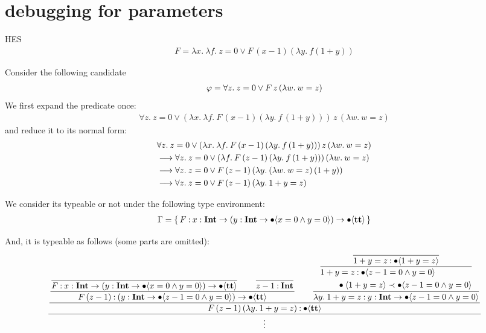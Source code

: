 \documentclass{article}
\begin{document}
\section{debugging for parameters}

HES
\begin{align*}
    F = \lambda x.\: \lambda f.\: z=0 \vee F\, (x-1) (\lambda y.\: f(1+y))
\end{align*}

Consider the following candidate
\begin{align*}
    \varphi = \forall z.\: z=0 \vee F\, z\, (\lambda w.\: w = z)
\end{align*}
We first expand the predicate once:
\begin{align*}
    \forall z.\: z =0\vee (\lambda x.\: \lambda f.\: F\, (x-1) (\lambda y.\: f\,(1+y)))\, z\, (\lambda w.\: w = z)
\end{align*}
and reduce it to its normal form:
\begin{align*}
    &\forall z.\: z=0 \vee (\lambda x.\: \lambda f.\: F\, (x-1)\, (\lambda y.\: f\,(1+y)))\, z\, (\lambda w.\: w = z) \\
    &\longrightarrow \forall z.\: z=0\vee (\lambda f.\: F\, (z-1)\, (\lambda y.\: f\,(1+y)))\, (\lambda w.\: w = z) \\
    &\longrightarrow \forall z.\: z=0 \vee F\, (z-1) \,(\lambda y.\: (\lambda w.\: w = z)\,(1+y))\\
    &\longrightarrow \forall z.\: z=0 \vee F\, (z-1)\, (\lambda y.\: 1+y = z)
\end{align*}

We consider its typeable or not under the following type environment:
\begin{align*}
    \Gamma = \{\, F \mathbin{:} {x} : \textbf{Int} \to ({y} : \textbf{Int} \to \bullet \langle x = 0 \wedge y = 0 \rangle) \to \bullet \langle \textbf{tt} \rangle \,\}
\end{align*}

And, it is typeable as follows (some parts are omitted):
\begin{equation*}
    \dfrac{
    \dfrac{
        \dfrac{
            \dfrac{
            }{
            F \mathbin{:} {x} : \textbf{Int} \to ({y} : \textbf{Int} \to \bullet \langle x = 0 \wedge y = 0 \rangle) \to \bullet \langle \textbf{tt} \rangle
            }
            \qquad
            \dfrac{}{
            z - 1 \mathbin{:} \textbf{Int}
            }
        }{
            F\, (z-1) \mathbin{:} ({y} : \textbf{Int} \to \bullet \langle z-1 = 0 \wedge y = 0 \rangle) \to \bullet \langle \textbf{tt} \rangle
        }
        \qquad
        \dfrac{
            \dfrac{
                \dfrac{
                }{
                    1 + y = z \mathbin{:} \bullet \langle 1 + y = z \rangle
                }
            }{
                \begin{aligned}
                    &1 + y = z \mathbin{:} \bullet \langle z-1 = 0 \wedge y = 0 \rangle \\
                    &\qquad \bullet \langle 1 + y = z \rangle \prec \bullet \langle z-1 = 0 \wedge y = 0 \rangle
                \end{aligned}
            }
        }{
            \lambda y.\: 1+y = z \mathbin{:} {y} : \textbf{Int} \to \bullet \langle z-1 = 0 \wedge y = 0 \rangle
        }
    }{
        F\, (z-1)\, (\lambda y.\: 1+y = z) \mathbin{:} \bullet \langle \textbf{tt} \rangle
    }}{
        \vdots
    }
\end{equation*}
\end{document}
